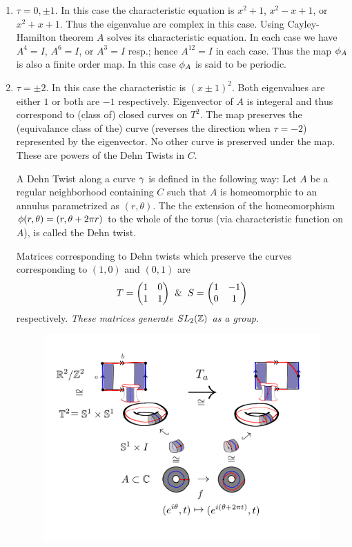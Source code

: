 \begin{enumerate}
  \item $\tau = 0, \pm 1$. In this case the characteristic equation is $x^2 +1$, $x^2-x+1$, or $x^2 + x+ 1$. Thus the eigenvalue are complex in this case. Using Cayley-Hamilton theorem $A$ solves its characteristic equation. In each case we have $A^4 = I$, $A^6=I$, or $A^3=I$ resp.; hence $A^{12} = I$ in each case. Thus the map $\phi_A$ is also a finite order map. In this case $\phi_A$ is said to be periodic.
  \item $\tau = \pm 2$. In this case the characteristic is $(x\pm 1)^2$. Both eigenvalues are either $1$ or both are $-1$ respectively. Eigenvector of $A$ is integeral and thus correspond to (class of) closed curves on $T^2$. The map preserves the (equivalance class of the) curve (reverses the direction when $\tau = -2$) represented by the eigenvector. No other curve is preserved under the map. These are powers of the Dehn Twists in $C$. 
    \begin{definition}
      A Dehn Twist along a curve $\gamma$ is defined in the following way: Let $A$ be a regular neighborhood containing $C$ such that $A$ is homeomorphic to an annulus parametrized as $(r,\theta)$. The the extension of the homeomorphism $\phi(r,\theta) = (r,\theta + 2\pi r)$ to the whole of the torus (via characteristic function on $A$), is called the Dehn twist.
    \end{definition}
    Matrices corresponding to Dehn twists which preserve the curves corresponding to $(1,0)$ and $(0,1)$ are
    \begin{align*}
      T = \begin{pmatrix}
        1 & 0\\ 1 & 1
      \end{pmatrix}
      \And
      S = \begin{pmatrix}
        1 & -1\\ 0 & 1
      \end{pmatrix}
    \end{align*}
    respectively. \textit{These matrices generate $SL_2(\mathbb{Z})$ as a group}.
    \begin{figure}
      \includegraphics[scale=0.5]{figures/Dehn_twist_for_the_torus.png}

\end{figure}
\end{enumerate}
